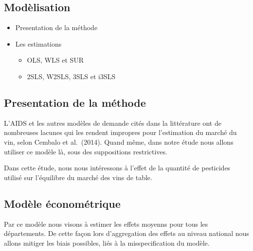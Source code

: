 \documentclass[11pt,]{article}
\providecommand{\tightlist}{%
  \setlength{\itemsep}{0pt}\setlength{\parskip}{0pt}}
\begin{document}
\FloatBarrier

\FloatBarrier

\hypertarget{modelisation-1}{%
\subsection{Modèlisation}\label{modelisation-1}}

\begin{itemize}
\tightlist
\item
  Presentation de la méthode
\item
  Les estimations

  \begin{itemize}
  \tightlist
  \item
    OLS, WLS et SUR
  \item
    2SLS, W2SLS, 3SLS et i3SLS
  \end{itemize}
\end{itemize}

\FloatBarrier

\hypertarget{presentation-de-la-methode}{%
\subsection{Presentation de la
méthode}\label{presentation-de-la-methode}}

L'AIDS et les autres modèles de demande cités dans la littérature ont de
nombreuses lacunes qui les rendent impropres pour l'estimation du marché
du vin, selon Cembalo et al.~(2014). Quand même, dans notre étude nous
allons utiliser ce modèle là, sous des suppositions restrictives.

\par

Dans cette étude, nous nous intéressons à l'effet de la quantité de
pesticides utilisé sur l'équilibre du marché des vins de table.

\hypertarget{modele-econometrique}{%
\subsection{Modèle économétrique}\label{modele-econometrique}}

Par ce modèle nous visons à estimer les effets moyenns pour tous les
départements. De cette façon lors d'aggregation des effets au niveau
national nous allons mitiger les biais possibles, liés à la
misspecification du modèle.

\par
\end{document}
